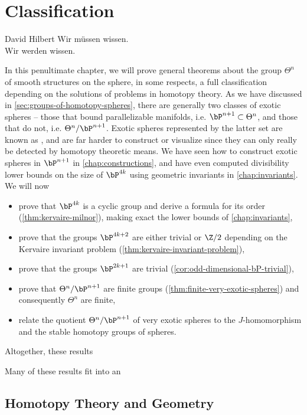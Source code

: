 \chapter{Classification}\label{chap:classification}

\begin{epigraph}{8.6em}{David Hilbert}
	Wir m\"ussen wissen.\\
	Wir werden wissen.
\end{epigraph}

In this penultimate chapter, we will prove general theorems about the group $\Theta^n$ of smooth structures on the sphere, in some respects, a full classification depending on the solutions of problems in homotopy theory. As we have discussed in \cref{sec:groups-of-homotopy-spheres}, there are generally two classes of exotic spheres -- those that bound parallelizable manifolds, i.e. $\bP^{n+1}\subset \Theta^n$, and those that do not, i.e. $\Theta^n/\bP^{n+1}$.
Exotic spheres represented by the latter set are known as , and are far harder to construct or visualize since they can only really be detected by homotopy theoretic means.
We have seen how to construct exotic spheres in $\bP^{n+1}$ in \cref{chap:constructions}, and have even computed divisibility lower bounds on the size of $\bP^{4k}$ using geometric invariants in \cref{chap:invariants}. We will now
\begin{itemize}
	\item prove that $\bP^{4k}$ is a cyclic group and derive a formula for its order (\cref{thm:kervaire-milnor}), making exact the lower bounds of \cref{chap:invariants},
	\item prove that the groups $\bP^{4k+2}$ are either trivial or $\Z/2$ depending on the Kervaire invariant problem (\cref{thm:kervaire-invariant-problem}),
	\item prove that the groups $\bP^{2k+1}$ are trivial (\cref{cor:odd-dimensional-bP-trivial}),
	\item prove that $\Theta^n/\bP^{n+1}$ are finite groups (\cref{thm:finite-very-exotic-spheres}) and consequently $\Theta^n$ are finite,
	\item relate the quotient $\Theta^n/\bP^{n+1}$ of very exotic spheres to the $J$-homomorphism and the stable homotopy groups of spheres.
\end{itemize}
Altogether, these results

Many of these results fit into an

\pagebreak
\section{Homotopy Theory and Geometry}\label{sec:homotopy-theory-geometry}

